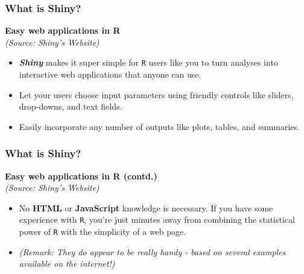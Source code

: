 \documentclass{beamer}
\begin{document}
\begin{frame}
\Large
\frametitle{What is Shiny?}
\textbf{Easy web applications in R}\\
\textit{(Source: Shiny's Website)}
\begin{itemize}
\item \textbf{\textit{Shiny}} makes it super simple for \texttt{R} users like you to turn analyses into interactive web applications that anyone can use. \item Let your users choose input parameters using friendly controls like sliders, drop-downs, and text fields. \item Easily incorporate any number of outputs like plots, tables, and summaries.
\end{itemize}
\end{frame}
\begin{frame}
\Large
\frametitle{What is Shiny?}
\vspace{-1cm}
\textbf{Easy web applications in R (contd.)}\\
\textit{(Source: Shiny's Website)}
\begin{itemize}
\item No \textbf{HTML} or \textbf{JavaScript} knowledge is necessary. If you have some experience with \texttt{R}, you’re just minutes away from combining the statistical power of \texttt{R} with the simplicity of a web page.
\item \textit{(Remark: They do appear to be really handy - based on several examples  available on the internet!)}
\end{itemize}

\end{frame}
\end{document}
